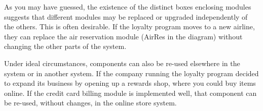 \newpage

As you may have guessed, the existence of the distinct boxes enclosing modules suggests that different modules may be replaced or upgraded independently of the others. This is often desirable. If the loyalty program moves to a new airline, they can replace the air reservation module (AirRes in the diagram) without changing the other parts of the system.

Under ideal circumstances, components can also be re-used elsewhere in the system or in another system. If the company running the loyalty program decided to expand its business by opening up a rewards shop, where you could buy items online. If the credit card billing module is implemented well, that component can be re-used, without changes, in the online store system. 





